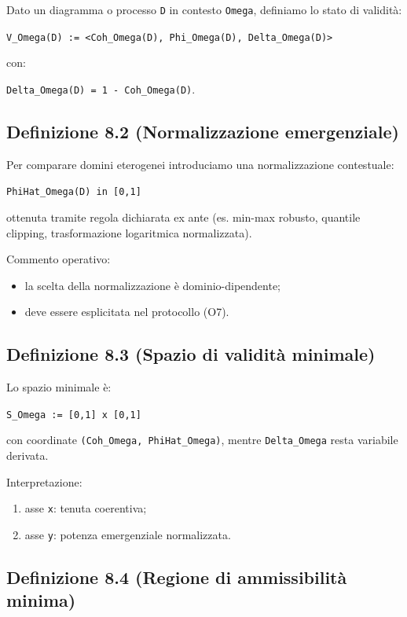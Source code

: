 Dato un diagramma o processo \texttt{D} in contesto \texttt{Omega}, definiamo lo stato di validità:

\texttt{V\_Omega(D)\ :=\ \textless{}Coh\_Omega(D),\ Phi\_Omega(D),\ Delta\_Omega(D)\textgreater{}}

con:

\texttt{Delta\_Omega(D)\ =\ 1\ -\ Coh\_Omega(D)}.

\subsection{Definizione 8.2 (Normalizzazione emergenziale)}

Per comparare domini eterogenei introduciamo una normalizzazione contestuale:

\texttt{PhiHat\_Omega(D)\ in\ {[}0,1{]}}

ottenuta tramite regola dichiarata ex ante (es. min-max robusto, quantile clipping, trasformazione logaritmica normalizzata).

Commento operativo:

\begin{itemize}
\tightlist
\item
  la scelta della normalizzazione è dominio-dipendente;
\item
  deve essere esplicitata nel protocollo (O7).
\end{itemize}

\subsection{Definizione 8.3 (Spazio di validità minimale)}

Lo spazio minimale è:

\texttt{S\_Omega\ :=\ {[}0,1{]}\ x\ {[}0,1{]}}

con coordinate \texttt{(Coh\_Omega,\ PhiHat\_Omega)}, mentre \texttt{Delta\_Omega} resta variabile derivata.

Interpretazione:

\begin{enumerate}
\def\labelenumi{\arabic{enumi}.}
\tightlist
\item
  asse \texttt{x}: tenuta coerentiva;
\item
  asse \texttt{y}: potenza emergenziale normalizzata.
\end{enumerate}

\subsection{Definizione 8.4 (Regione di ammissibilità minima)}

